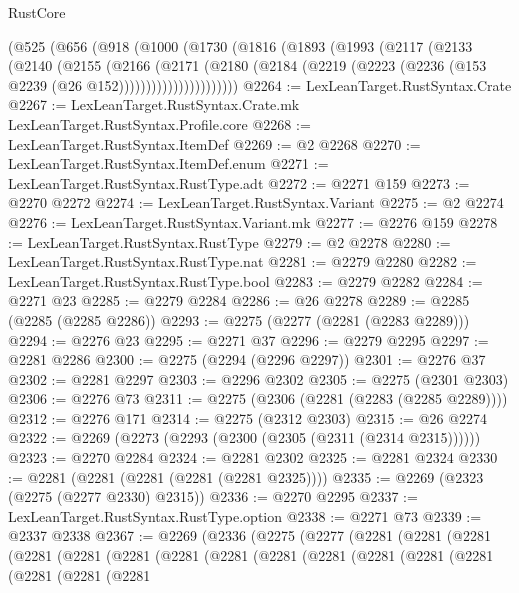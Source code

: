 \begin{lexlean}{RustCore}
\begin{coremodule}
      (@525
        (@656
          (@918
            (@1000
              (@1730
                (@1816
                  (@1893
                    (@1993
                      (@2117
                        (@2133
                          (@2140
                            (@2155
                              (@2166
                                (@2171
                                  (@2180
                                    (@2184
                                      (@2219
                                        (@2223 (@2236 (@153 @2239 (@26 @152))))))))))))))))))))))
@2264 := LexLeanTarget.RustSyntax.Crate
@2267 := LexLeanTarget.RustSyntax.Crate.mk LexLeanTarget.RustSyntax.Profile.core
@2268 := LexLeanTarget.RustSyntax.ItemDef
@2269 := @2 @2268
@2270 := LexLeanTarget.RustSyntax.ItemDef.enum
@2271 := LexLeanTarget.RustSyntax.RustType.adt
@2272 := @2271 @159
@2273 := @2270 @2272
@2274 := LexLeanTarget.RustSyntax.Variant
@2275 := @2 @2274
@2276 := LexLeanTarget.RustSyntax.Variant.mk
@2277 := @2276 @159
@2278 := LexLeanTarget.RustSyntax.RustType
@2279 := @2 @2278
@2280 := LexLeanTarget.RustSyntax.RustType.nat
@2281 := @2279 @2280
@2282 := LexLeanTarget.RustSyntax.RustType.bool
@2283 := @2279 @2282
@2284 := @2271 @23
@2285 := @2279 @2284
@2286 := @26 @2278
@2289 := @2285 (@2285 (@2285 @2286))
@2293 := @2275 (@2277 (@2281 (@2283 @2289)))
@2294 := @2276 @23
@2295 := @2271 @37
@2296 := @2279 @2295
@2297 := @2281 @2286
@2300 := @2275 (@2294 (@2296 @2297))
@2301 := @2276 @37
@2302 := @2281 @2297
@2303 := @2296 @2302
@2305 := @2275 (@2301 @2303)
@2306 := @2276 @73
@2311 := @2275 (@2306 (@2281 (@2283 (@2285 @2289))))
@2312 := @2276 @171
@2314 := @2275 (@2312 @2303)
@2315 := @26 @2274
@2322 := @2269 (@2273 (@2293 (@2300 (@2305 (@2311 (@2314 @2315))))))
@2323 := @2270 @2284
@2324 := @2281 @2302
@2325 := @2281 @2324
@2330 := @2281 (@2281 (@2281 (@2281 (@2281 @2325))))
@2335 := @2269 (@2323 (@2275 (@2277 @2330) @2315))
@2336 := @2270 @2295
@2337 := LexLeanTarget.RustSyntax.RustType.option
@2338 := @2271 @73
@2339 := @2337 @2338
@2367 := @2269
    (@2336
      (@2275
        (@2277
          (@2281
            (@2281
              (@2281
                (@2281
                  (@2281
                    (@2281
                      (@2281
                        (@2281
                          (@2281
                            (@2281
                              (@2281
                                (@2281
                                  (@2281
                                    (@2281
                                      (@2281
                                        (@2281

\end{coremodule}
\end{lexlean}
